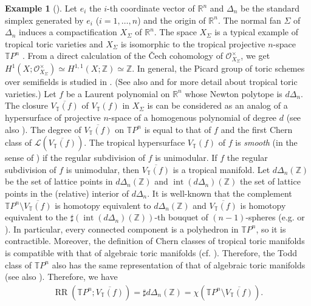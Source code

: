 \documentclass[a4paper,dvipdfmx,reqno,12pt]{amsart}
\theoremstyle{definition}
\newtheorem{example}[theorem]{Example}
\newcommand{\opn}[1]{\operatorname{#1}}
\numberwithin{equation}{section}
\begin{document}
\begin{example}[{\cite[Example 2.11]{demedrano2023chern}}]
\label{example-TPn}
Let $e_i$ the $i$-th coordinate vector of $\mathbb{R}^n$
and $\Delta_{n}$ be the standard simplex generated by
$e_i$ ($i=1,\ldots,n$) and the origin of $\mathbb{R}^n$.
The normal fan $\Sigma$ of $\Delta_{n}$ induces 
a compactification $X_{\Sigma}$ of $\mathbb{R}^n$.
The space $X_{\Sigma}$ is a typical example of
tropical toric varieties \cite{MR2428356,MR2511632}
and $X_{\Sigma}$ is
isomorphic to the tropical projective
$n$-space $\mathbb{T}P^{n}$ \cite[Example 3.10]{MR2275625}.
From a direct calculation of the \v{C}ech cohomology of
$\mathcal{O}_{X_{\Sigma}}^{\times}$, we get 
$H^{1}(X;\mathcal{O}_{X_{\Sigma}}^{\times})
\simeq H^{1,1}(X;\mathbb{Z})\simeq \mathbb{Z}$.
In general, the Picard group of toric 
schemes over semifields is studied in \cite{MR4016643}. 
(See also  and
\cite[Chapter 3]{mikhalkin2018tropical} for more detail
about tropical toric varieties.)
Let $f$ be a Laurent polynomial on $\mathbb{R}^{n}$
whose Newton polytope is $d\Delta_{n}$.
The closure $\overline{V_{\mathbb{T}}(f)}$ of 
$V_{\mathbb{T}}(f)$ in $X_{\Sigma}$
is can be considered
as an analog of a hypersurface of projective $n$-space of
a homogenous polynomial of degree $d$
(see also \cite[Definition 3.4.6]{mikhalkin2018tropical}).
The degree of $\overline{V_{\mathbb{T}}(f)}$
on $\mathbb{T}P^n$ is equal to 
that of $f$ and the first Chern class 
of $\mathcal{L}(\overline{V_{\mathbb{T}}(f)})$.
The tropical hypersurface $V_{\mathbb{T}}(f)$ of $f$
is \emph{smooth} (in the sense of
\cite[]{MR3287221})
if the regular subdivision of $f$ is unimodular.
If $f$ the regular subdivision of $f$ is unimodular,
then $\overline{V_{\mathbb{T}}(f)}$ is a tropical manifold.
Let $d\Delta_n(\mathbb{Z})$ be the set of lattice points
in $d\Delta_n(\mathbb{Z})$ and 
$\opn{int}(d\Delta_n)(\mathbb{Z})$ the set of lattice points
in the (relative) interior of $d\Delta_n$.
It is well-known that the complement 
$\mathbb{T}P^{n}\setminus
\overline{V_{\mathbb{T}}(f)}$ is homotopy equivalent
to $d\Delta_n(\mathbb{Z})$ and 
$\overline{V_{\mathbb{T}}(f)}$ is homotopy equivalent
to the $\sharp (\opn{int}(d\Delta_n)(\mathbb{Z}))$-th
bouquet of $(n-1)$-spheres
(e.g. \cite[Proposition 3.1.6]{MR3287221}
or \cite[Proposition 3.4.12]{mikhalkin2018tropical}).
In particular, every connected component is a polyhedron in 
$\mathbb{T}P^{n}$, so it is contractible.
Moreover, the definition of Chern classes of
tropical toric manifolds is compatible with
that of algebraic toric manifolds
(cf. \cite[Proposition 13.1.2]{MR2810322}).
Therefore, the Todd class of $\mathbb{T}P^{n}$
also has the same representation of that of
algebraic toric manifolds
(see also \cite[Theorem 13.1.6]{MR2810322}). 
Therefore, we have
\begin{align}
\opn{RR}(\mathbb{T}P^{n};\overline{V_{\mathbb{T}}(f)})=
\sharp d\Delta_n(\mathbb{Z})=
\chi(\mathbb{T}P^{n}\setminus
\overline{V_{\mathbb{T}}(f)}).
\end{align}


\end{example}
\end{document}
